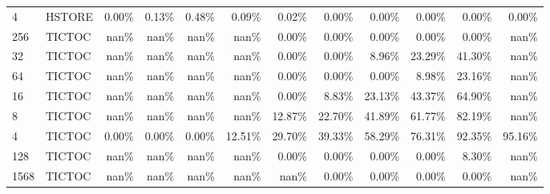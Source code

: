 \begin{tabular}{llrrrrrrrrrr}
4    & HSTORE & 0.00\% & 0.13\% & 0.48\% &  0.09\% &  0.02\% &  0.00\% &  0.00\% &  0.00\% &  0.00\% &  0.00\% \\
256  & TICTOC &  nan\% &  nan\% &  nan\% &   nan\% &  0.00\% &  0.00\% &  0.00\% &  0.00\% &  0.00\% &   nan\% \\
32   & TICTOC &  nan\% &  nan\% &  nan\% &   nan\% &  0.00\% &  0.00\% &  8.96\% & 23.29\% & 41.30\% &   nan\% \\
64   & TICTOC &  nan\% &  nan\% &  nan\% &   nan\% &  0.00\% &  0.00\% &  0.00\% &  8.98\% & 23.16\% &   nan\% \\
16   & TICTOC &  nan\% &  nan\% &  nan\% &   nan\% &  0.00\% &  8.83\% & 23.13\% & 43.37\% & 64.90\% &   nan\% \\
8    & TICTOC &  nan\% &  nan\% &  nan\% &   nan\% & 12.87\% & 22.70\% & 41.89\% & 61.77\% & 82.19\% &   nan\% \\
4    & TICTOC & 0.00\% & 0.00\% & 0.00\% & 12.51\% & 29.70\% & 39.33\% & 58.29\% & 76.31\% & 92.35\% & 95.16\% \\
128  & TICTOC &  nan\% &  nan\% &  nan\% &   nan\% &  0.00\% &  0.00\% &  0.00\% &  0.00\% &  8.30\% &   nan\% \\
1568 & TICTOC &  nan\% &  nan\% &  nan\% &   nan\% &   nan\% &  0.00\% &  0.00\% &  0.00\% &  0.00\% &   nan\% \\
\bottomrule
\end{tabular}
